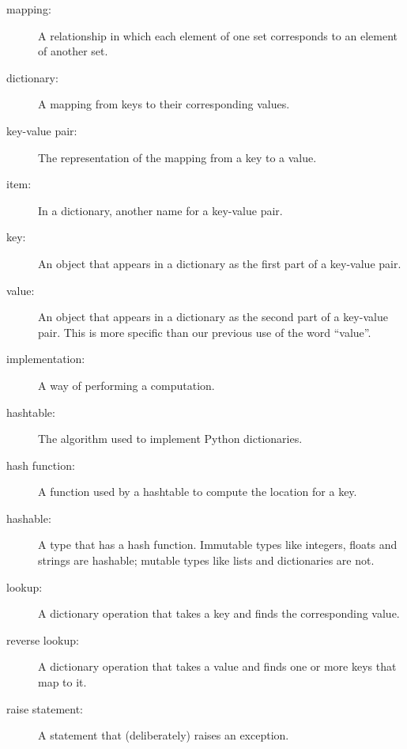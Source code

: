 \documentclass[10pt]{book}
\begin{document}
\begin{description}

\item[mapping:] A relationship in which each element of one set
corresponds to an element of another set.

\item[dictionary:] A mapping from keys to their
corresponding values.

\item[key-value pair:] The representation of the mapping from
a key to a value.

\item[item:] In a dictionary, another name for a key-value
  pair.

\item[key:] An object that appears in a dictionary as the
first part of a key-value pair.

\item[value:] An object that appears in a dictionary as the
second part of a key-value pair.  This is more specific than
our previous use of the word ``value''.

\item[implementation:] A way of performing a computation.

\item[hashtable:] The algorithm used to implement Python
dictionaries.

\item[hash function:] A function used by a hashtable to compute the
location for a key.

\item[hashable:] A type that has a hash function.  Immutable
types like integers,
floats and strings are hashable; mutable types like lists and
dictionaries are not.

\item[lookup:] A dictionary operation that takes a key and finds
the corresponding value.

\item[reverse lookup:] A dictionary operation that takes a value and finds
one or more keys that map to it.

\item[raise statement:]  A statement that (deliberately) raises an exception.


\end{description}
\end{document}
